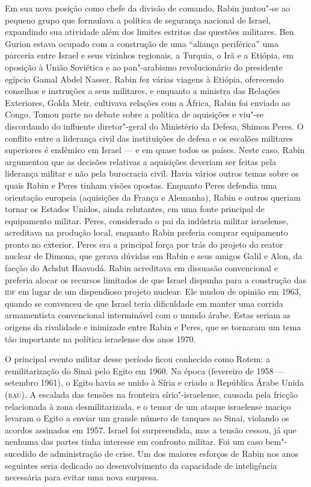 Em sua nova posição como chefe da divisão de comando, Rabin juntou"-se ao
pequeno grupo que formulava a política de segurança nacional de Israel,
expandindo sua atividade além dos limites estritos das questões
militares. Ben Gurion estava ocupado com a construção de uma ``aliança
periférica'' uma parceria entre Israel e seus vizinhos regionais, a
Turquia, o Irã e a Etiópia, em oposição à União Soviética e ao
pan"-arabismo revolucionário do presidente egípcio Gamal Abdel Nasser.
Rabin fez várias viagens à Etiópia, oferecendo conselhos e instruções a
seus militares, e enquanto a ministra das Relações Exteriores, Golda Meir,
cultivava relações com a África, Rabin foi enviado ao Congo. Tomou parte
no debate sobre a política de aquisições e viu"-se discordando do
influente diretor"-geral do Ministério da Defesa, Shimon Peres. O
conflito entre a liderança civil das instituições de defesa e os
escalões militares superiores é endêmico em Israel --- e em quase todos
os países. Neste caso, Rabin argumentou que as decisões relativas a
aquisições deveriam ser feitas pela liderança militar e não pela
burocracia civil. Havia vários outros temas sobre os quais Rabin e Peres
tinham visões opostas. Enquanto Peres defendia uma orientação europeia
(aquisições da França e Alemanha), Rabin e outros queriam tornar os
Estados Unidos, ainda relutantes, em uma fonte principal de equipamento
militar. Peres, considerado o pai da indústria militar israelense,
acreditava na produção local, enquanto Rabin preferia comprar
equipamento pronto no exterior. Peres era a principal força por trás do
projeto do reator nuclear de Dimona, que gerava dúvidas em Rabin e seus
amigos Galil e Alon, da facção do Achdut Haavodá. Rabin acreditava em
dissuasão convencional e preferia alocar os recursos limitados de que
Israel dispunha para a construção das \textsc{idf} em lugar de um dispendioso
projeto nuclear. Ele mudou de opinião em 1963, quando se convenceu de
que Israel teria dificuldade em manter uma corrida armamentista
convencional interminável com o mundo árabe. Estas seriam as origens da
rivalidade e inimizade entre Rabin e Peres, que se tornaram um tema tão
importante na política israelense dos anos 1970.

O principal evento militar desse período ficou conhecido como Rotem: a
remilitarização do Sinai pelo Egito em 1960. Na época (fevereiro de
1958 --- setembro 1961), o Egito havia se unido à Síria e criado a
República Árabe Unida (\textsc{rau}). A escalada das tensões na fronteira
sírio"-israelense, causada pela fricção relacionada à zona
desmilitarizada, e o temor de um ataque israelense maciço levaram o
Egito a enviar um grande número de tanques ao Sinai, violando os acordos
assinados em 1957. Israel foi surpreendida, mas a tensão cessou, já que
nenhuma das partes tinha interesse em confronto militar. Foi um caso bem"-sucedido
de administração de crise. Um dos maiores esforços de Rabin nos
anos seguintes seria dedicado ao desenvolvimento da capacidade de
inteligência necessária para evitar uma nova surpresa.

